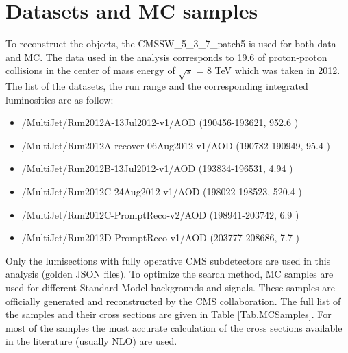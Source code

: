 \section{Datasets and MC samples}
\label{sect:dataMC}
To reconstruct the objects, the CMSSW\_5\_3\_7\_patch5 is used for both data and MC.
The data used in the analysis corresponds to 19.6 \invfb of proton-proton collisions in the center of mass energy of $\sqrt{s}$ = 8 TeV 
which was taken in 2012. The list of the datasets, the run range and the corresponding integrated luminosities are as follow:
\begin{itemize}
\item /MultiJet/Run2012A-13Jul2012-v1/AOD (190456-193621, 952.6 \invpb) 
\item /MultiJet/Run2012A-recover-06Aug2012-v1/AOD (190782-190949, 95.4 \invpb) 
\item /MultiJet/Run2012B-13Jul2012-v1/AOD (193834-196531, 4.94 \invfb)
\item /MultiJet/Run2012C-24Aug2012-v1/AOD (198022-198523, 520.4 \invpb)
\item /MultiJet/Run2012C-PromptReco-v2/AOD (198941-203742, 6.9 \invfb)
\item /MultiJet/Run2012D-PromptReco-v1/AOD (203777-208686, 7.7 \invfb)
\end{itemize}

Only the lumisections with fully operative CMS subdetectors are used in this analysis (golden JSON files). To optimize the search method, MC 
samples are used for different Standard Model backgrounds and signals. These samples are officially generated and reconstructed by the CMS
collaboration. The full list of the samples and their cross sections are given in Table \ref{Tab.MCSamples}. For most of the samples the most 
accurate calculation of the cross sections available in the literature (usually NLO) are used.

